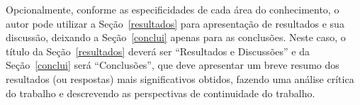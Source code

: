 \documentclass[10pt, a4paper]{article}
\begin{document}
Opcionalmente, conforme as especificidades de cada área do conhecimento, o autor pode utilizar a Seção~\ref{resultados} para apresentação de resultados e sua discussão, deixando a Seção~\ref{conclui} apenas para as conclusões. Neste caso, o título da Seção~\ref{resultados} deverá ser “Resultados e Discussões” e da Seção~\ref{conclui} será “Conclusões”, que deve apresentar um breve resumo dos resultados (ou respostas) mais significativos obtidos, fazendo uma análise crítica do trabalho e descrevendo as perspectivas de continuidade do trabalho.





\end{document}
